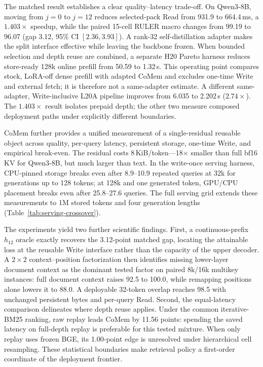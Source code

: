 The matched result establishes a clear quality--latency trade-off. On
Qwen3-8B, moving from $j{=}0$ to $j{=}12$ reduces selected-pack Read from
931.9 to 664.4\,ms, a $1.403\times$ speedup, while the paired 15-cell RULER
macro changes from 99.19 to 96.07 (gap 3.12, 95\% CI $[2.36,3.93]$). A
rank-32 self-distillation adapter makes the split interface effective while
leaving the backbone frozen. When bounded selection and depth reuse are
combined, a separate H20 Pareto harness reduces store-ready 128k online prefill
from 50.59 to 1.32\,s. This operating point compares stock,
LoRA-off dense prefill with adapted CoMem and excludes one-time Write and
external fetch; it is therefore not a same-adapter estimate. A different
same-adapter, Write-inclusive L20A pipeline improves from 6.035 to 2.202\,s
($2.74\times$). The $1.403\times$ result isolates prepaid depth; the other two
measure composed deployment paths under explicitly different boundaries.

CoMem further provides a unified measurement of a
single-residual reusable object across quality, per-query latency, persistent
storage, one-time Write, and empirical break-even. The residual costs
8\,KiB/token---18$\times$ smaller than full bf16 KV for Qwen3-8B, but much
larger than text. In the write-once serving harness, CPU-pinned storage breaks
even after 8.9--10.9 repeated queries at 32k for generations up to 128 tokens;
at 128k and one generated token, GPU/CPU placement breaks even after
25.8--27.6 queries. The full serving grid extends these measurements to 1M
stored tokens and four generation lengths (Table~\ref{tab:serving-crossover}).

The experiments yield two further scientific findings. First, a
continuous-prefix $h_{12}$ oracle exactly recovers the 3.12-point matched gap,
locating the attainable loss at the reusable Write interface rather than the
capacity of the upper decoder. A $2{\times}2$ context--position factorization
then identifies missing lower-layer document context as the dominant tested
factor on paired 8k/16k multikey instances: full document context raises 92.5
to 100.0, while remapping positions alone lowers it to 88.0. A deployable
32-token overlap reaches 98.5 with unchanged persistent bytes and per-query
Read. Second, the equal-latency comparison delineates where depth reuse
applies. Under the common iterative-BM25 ranking, raw replay leads CoMem by
11.56 points: spending the saved latency on full-depth replay is preferable for
this tested mixture. When only replay uses frozen BGE, its 1.00-point edge is
unresolved under hierarchical cell resampling. These statistical boundaries
make retrieval policy a first-order coordinate of the deployment frontier.

